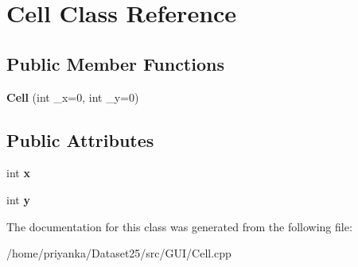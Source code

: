 \hypertarget{classCell}{\section{\-Cell \-Class \-Reference}
\label{classCell}
}
\subsection*{\-Public \-Member \-Functions}
\begin{DoxyCompactItemize}
\item 
\hypertarget{classCell_ac9deb0abf1586438c2ab67c5ccaee8b2}{{\bfseries \-Cell} (int \-\_\-x=0, int \-\_\-y=0)}\label{classCell_ac9deb0abf1586438c2ab67c5ccaee8b2}

\end{DoxyCompactItemize}
\subsection*{\-Public \-Attributes}
\begin{DoxyCompactItemize}
\item 
\hypertarget{classCell_ac008158796a0bfdf37be2f26eff651ef}{int {\bfseries x}}\label{classCell_ac008158796a0bfdf37be2f26eff651ef}

\item 
\hypertarget{classCell_ab99a0cead05c6b8129ddf3231b11c1ad}{int {\bfseries y}}\label{classCell_ab99a0cead05c6b8129ddf3231b11c1ad}

\end{DoxyCompactItemize}


\-The documentation for this class was generated from the following file\-:\begin{DoxyCompactItemize}
\item 
/home/priyanka/\-Dataset25/src/\-G\-U\-I/\-Cell.\-cpp\end{DoxyCompactItemize}
